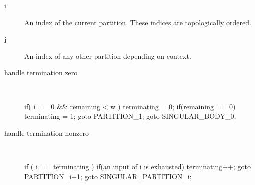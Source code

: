 \begin{description}
  \item[i] An index of the current partition. These indices are topologically ordered.
  \item[j] An index of any other partition depending on context. 
  \item[handle termination zero] \ \ \ 
\begin{samepage}
\begin{code}
if( i == 0 && remaining < w )                            
{                                                          
  terminating = 0;                                     
  if(remaining == 0)                                   
  {                                                    
    terminating = 1;                                   
    goto PARTITION_1;                            
  }                                                    
  goto SINGULAR_BODY_0;
}                                                      
\end{code}
\end{samepage}
\item[handle termination nonzero] \ \ \ 
\begin{samepage}
\begin{code}
if ( i == terminating )                                   
{                                                          
  if(an input of i is exhausted)                  
  {                                                        
    terminating++;                                         
    goto PARTITION_i+1;                                
  }                                                        
  goto SINGULAR_PARTITION_i;
}   
\end{code}
\end{samepage}
\end{description}
\myendalg

